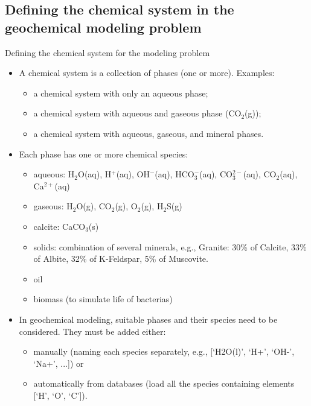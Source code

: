 %
\subsection{Defining the chemical system in the geochemical modeling problem}
%
\begin{frame}{Defining the chemical system for the modeling problem}
\begin{itemize}
\item A chemical system is a collection of phases (one or more). Examples:
\begin{itemize}
\item a chemical system with only an aqueous phase;
\item a chemical system with aqueous and gaseous phase (CO$_2$(g));
\item a chemical system with aqueous, gaseous, and mineral phases.
\end{itemize}
\pause
\item Each phase has one or more chemical species:
\begin{itemize}
\item aqueous: H$_{2}$O(aq), H$^{+}$(aq), OH$^{-}$(aq), HCO$_{3}^{-}$(aq),
CO$_{3}^{2-}$(aq), CO$_{2}$(aq), Ca$^{2+}$(aq)
\item gaseous: H$_{2}$O(g), CO$_{2}$(g), O$_{2}$(g), H$_{2}$S(g)
\item calcite: CaCO$_{3}$(s)
\item solids: combination of several minerals, e.g., Granite: 30\% of Calcite, 33\% of Albite, 32\% of K-Feldspar, 5\% of Muscovite. 
\item oil
\item biomass (to simulate life of bacterias)
\end{itemize}
\pause
\item In geochemical modeling, suitable phases and their species need to
be considered. They must be added either: 
\begin{itemize}
\item manually (naming each species separately, e.g., [`H2O(l)', `H+', `OH-', `Na+', ...]) or 
\item automatically from databases (load all the species containing elements [`H', `O', `C']).
\end{itemize}
\end{itemize}
\end{frame}
